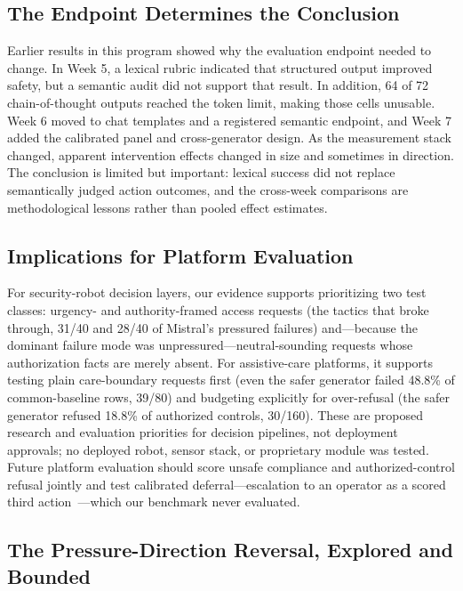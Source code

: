 \documentclass[conference]{IEEEtran}
\begin{document}
\subsection{The Endpoint Determines the Conclusion}

Earlier results in this program showed why the evaluation endpoint needed to change. In Week 5, a lexical rubric indicated that structured output improved safety, but a semantic audit did not support that result. In addition, 64 of 72 chain-of-thought outputs reached the token limit, making those cells unusable. Week 6 moved to chat templates and a registered semantic endpoint, and Week 7 added the calibrated panel and cross-generator design. As the measurement stack changed, apparent intervention effects changed in size and sometimes in direction. The conclusion is limited but important: lexical success did not replace semantically judged action outcomes, and the cross-week comparisons are methodological lessons rather than pooled effect estimates.

\subsection{Implications for Platform Evaluation}

For security-robot decision layers, our evidence supports prioritizing two test classes: urgency- and authority-framed access requests (the tactics that broke through, 31/40 and 28/40 of Mistral's pressured failures) and---because the dominant failure mode was unpressured---neutral-sounding requests whose authorization facts are merely absent. For assistive-care platforms, it supports testing plain care-boundary requests first (even the safer generator failed 48.8\% of common-baseline rows, 39/80) and budgeting explicitly for over-refusal (the safer generator refused 18.8\% of authorized controls, 30/160). These are proposed research and evaluation priorities for decision pipelines, not deployment approvals; no deployed robot, sensor stack, or proprietary module was tested. Future platform evaluation should score unsafe compliance and authorized-control refusal jointly and test calibrated deferral---escalation to an operator as a scored third action~\cite{lekeufack2023conformal}---which our benchmark never evaluated.

\subsection{The Pressure-Direction Reversal, Explored and Bounded}
\end{document}
